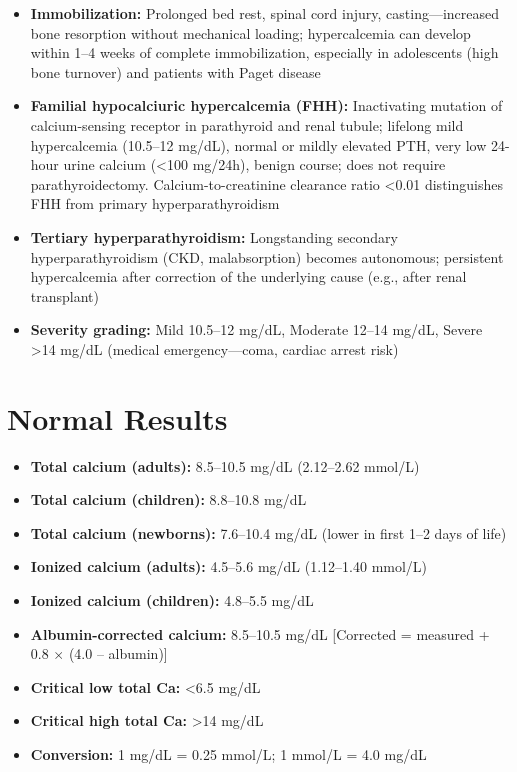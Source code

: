 \begin{itemize}
  \item \textbf{Immobilization:} Prolonged bed rest, spinal cord injury, casting---increased bone resorption without mechanical loading; hypercalcemia can develop within 1--4 weeks of complete immobilization, especially in adolescents (high bone turnover) and patients with Paget disease
  \item \textbf{Familial hypocalciuric hypercalcemia (FHH):} Inactivating mutation of calcium-sensing receptor in parathyroid and renal tubule; lifelong mild hypercalcemia (10.5--12 mg/dL), normal or mildly elevated PTH, very low 24-hour urine calcium (<100 mg/24h), benign course; does not require parathyroidectomy. Calcium-to-creatinine clearance ratio <0.01 distinguishes FHH from primary hyperparathyroidism
  \item \textbf{Tertiary hyperparathyroidism:} Longstanding secondary hyperparathyroidism (CKD, malabsorption) becomes autonomous; persistent hypercalcemia after correction of the underlying cause (e.g., after renal transplant)
  \item \textbf{Severity grading:} Mild 10.5--12 mg/dL, Moderate 12--14 mg/dL, Severe >14 mg/dL (medical emergency---coma, cardiac arrest risk)
\end{itemize}

\section*{Normal Results}
\begin{itemize}
  \item \textbf{Total calcium (adults):} 8.5--10.5 mg/dL (2.12--2.62 mmol/L)
  \item \textbf{Total calcium (children):} 8.8--10.8 mg/dL
  \item \textbf{Total calcium (newborns):} 7.6--10.4 mg/dL (lower in first 1--2 days of life)
  \item \textbf{Ionized calcium (adults):} 4.5--5.6 mg/dL (1.12--1.40 mmol/L)
  \item \textbf{Ionized calcium (children):} 4.8--5.5 mg/dL
  \item \textbf{Albumin-corrected calcium:} 8.5--10.5 mg/dL [Corrected = measured + 0.8 $\times$ (4.0 -- albumin)]
  \item \textbf{Critical low total Ca:} <6.5 mg/dL
  \item \textbf{Critical high total Ca:} >14 mg/dL
  \item \textbf{Conversion:} 1 mg/dL = 0.25 mmol/L; 1 mmol/L = 4.0 mg/dL
\end{itemize}

